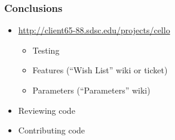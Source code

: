 \begin{frame}[fragile] \frametitle{Conclusions}
\begin{itemize}
\item \textcolor{blue}{\url{http://client65-88.sdsc.edu/projects/cello}}
\begin{itemize}
\item Testing
\item Features (``Wish List'' wiki or ticket)
\item Parameters (``Parameters'' wiki)
\end{itemize}
\item Reviewing code
\item Contributing code
\end{itemize}
\end{frame}
